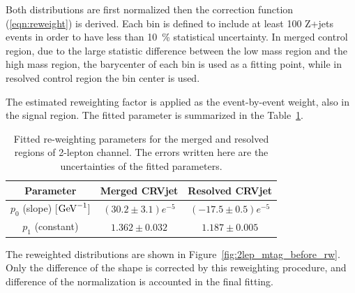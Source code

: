 Both distributions are first normalized then the correction function (\ref{eqn:reweight}) is derived. 
Each bin is defined to include at least 100 Z+jets events in order to have less than 10~\% statistical uncertainty. 
In merged control region, due to the large statistic difference between the low mass region and the high mass region, the barycenter of each bin is used as a fitting point, while in resolved control region the bin center is used.

The estimated reweighting factor is applied as the event-by-event weight, also in the signal region.
The fitted parameter is summarized in the Table~\ref{tab:fit}. 

\begin{table}[htbp]
 \footnotesize
\begin{center}
\begin{tabular}{ | c | c | c |}
\hline
Parameter & Merged CRVjet & Resolved CRVjet  \\
\hline
$p_{0}$ (slope) [$\mathrm{GeV}^{-1}$] & $(30.2 \pm 3.1)e^{-5}$ &  $(-17.5 \pm 0.5)e^{-5}$ \\
 \hline
$p_{1}$ (constant)  & $1.362 \pm 0.032$ & $1.187 \pm 0.005$ \\
\hline
\end{tabular}
\caption{\label{tab:fit} Fitted re-weighting parameters for the merged and resolved regions of 2-lepton channel. The errors written here are the uncertainties of the fitted parameters. }
  \end{center}
\end{table}



The reweighted distributions are shown in Figure~\ref{fig:2lep_mtag_before_rw}.
Only the difference of the shape is corrected by this reweighting procedure, and difference of the normalization is accounted in the final fitting.

